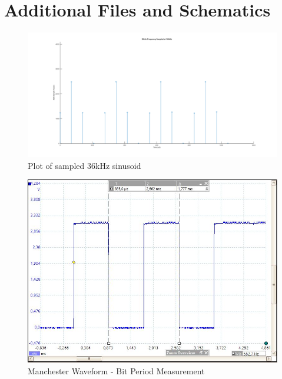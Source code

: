 \chapter{Additional Files and Schematics}
\label{ch_appendixa}






\begin{figure}[H]
	\centering
	\includegraphics[width=\linewidth]{figures/results/36khz_frequency.png}
	\caption{Plot of sampled 36kHz sinusoid}
	\label{fig:sampled_36khz_sinusoid}
\end{figure}

\begin{figure}[H]
	\centering
	\includegraphics[width=.8\linewidth]{figures/results/manchester/delta_bit_period.JPG}
	\caption{Manchester Waveform - Bit Period Measurement}
	\label{fig:delta_bit_period}
\end{figure}

